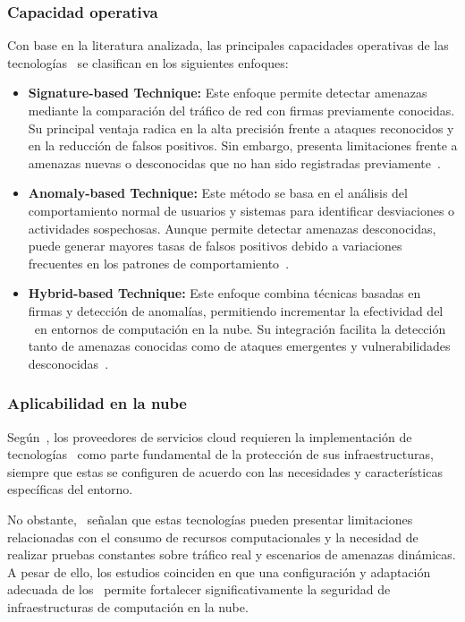 \subsubsection{Capacidad operativa}

Con base en la literatura analizada, las principales capacidades operativas de las tecnologías \IDPS\ se clasifican en los siguientes 
enfoques:

\begin{itemize}
	\item \textbf{Signature-based Technique:} Este enfoque permite detectar amenazas mediante la comparación del tráfico de red con firmas previamente conocidas. Su principal ventaja radica en la alta precisión frente a ataques reconocidos y en la reducción de falsos positivos. Sin embargo, presenta limitaciones frente a amenazas nuevas o desconocidas que no han sido registradas previamente~\cite{nasim2025idps}.
	
	\item \textbf{Anomaly-based Technique:} Este método se basa en el análisis del comportamiento normal de usuarios y sistemas para identificar desviaciones o actividades sospechosas. Aunque permite detectar amenazas desconocidas, puede generar mayores tasas de falsos positivos debido a variaciones frecuentes en los patrones de comportamiento~\cite{nasim2025idps}.
	
	\item \textbf{Hybrid-based Technique:} Este enfoque combina técnicas basadas en firmas y detección de anomalías, permitiendo incrementar la efectividad del \IDPS\ en entornos de computación en la nube. Su integración facilita la detección tanto de amenazas conocidas como de ataques emergentes y vulnerabilidades desconocidas~\cite{nasim2025idps}.
\end{itemize}

\subsubsection{Aplicabilidad en la nube}

Según~\cite{adiwal2023cloud}, los proveedores de servicios cloud requieren la implementación de tecnologías \IDPS\ como parte fundamental 
de la protección de sus infraestructuras, siempre que estas se configuren de acuerdo con las necesidades y características específicas del 
entorno.

No obstante,~\cite{nasim2025idps} señalan que estas tecnologías pueden presentar limitaciones relacionadas con el consumo de recursos 
computacionales y la necesidad de realizar pruebas constantes sobre tráfico real y escenarios de amenazas dinámicas. A pesar de ello, los 
estudios coinciden en que una configuración y adaptación adecuada de los \IDPS\ permite fortalecer significativamente la seguridad de 
infraestructuras de computación en la nube.

